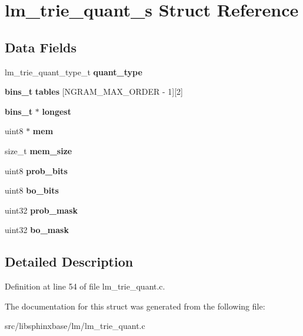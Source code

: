 \section{lm\+\_\+trie\+\_\+quant\+\_\+s Struct Reference}
\label{structlm__trie__quant__s}
\subsection*{Data Fields}
\begin{DoxyCompactItemize}
\item 
\mbox{\label{structlm__trie__quant__s_a45b2e48c780354c98a7437c3d2eaf341}} 
lm\+\_\+trie\+\_\+quant\+\_\+type\+\_\+t {\bfseries quant\+\_\+type}
\item 
\mbox{\label{structlm__trie__quant__s_ad0c255a6af8c121e154bafd6d4eb023b}} 
\textbf{ bins\+\_\+t} {\bfseries tables} [N\+G\+R\+A\+M\+\_\+\+M\+A\+X\+\_\+\+O\+R\+D\+ER -\/ 1][2]
\item 
\mbox{\label{structlm__trie__quant__s_a218f78c52d512605133668b765e3260b}} 
\textbf{ bins\+\_\+t} $\ast$ {\bfseries longest}
\item 
\mbox{\label{structlm__trie__quant__s_add104d4880f471d73fd886b2eae7ca66}} 
uint8 $\ast$ {\bfseries mem}
\item 
\mbox{\label{structlm__trie__quant__s_a348c9280b8fccbac99890a5bf3a69d94}} 
size\+\_\+t {\bfseries mem\+\_\+size}
\item 
\mbox{\label{structlm__trie__quant__s_a3696f006dc23c7faddd81419aae4de64}} 
uint8 {\bfseries prob\+\_\+bits}
\item 
\mbox{\label{structlm__trie__quant__s_a7d8ec82f7dde68d7a7e4ea495972bddc}} 
uint8 {\bfseries bo\+\_\+bits}
\item 
\mbox{\label{structlm__trie__quant__s_ad70aed4374709125a85a915815538a61}} 
uint32 {\bfseries prob\+\_\+mask}
\item 
\mbox{\label{structlm__trie__quant__s_a2b8c82b5f452346651055c0cd7a3b3f2}} 
uint32 {\bfseries bo\+\_\+mask}
\end{DoxyCompactItemize}


\subsection{Detailed Description}


Definition at line 54 of file lm\+\_\+trie\+\_\+quant.\+c.



The documentation for this struct was generated from the following file\+:\begin{DoxyCompactItemize}
\item 
src/libsphinxbase/lm/lm\+\_\+trie\+\_\+quant.\+c\end{DoxyCompactItemize}
